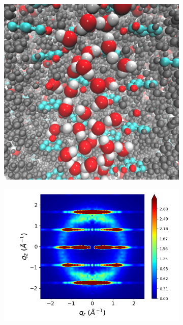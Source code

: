 \documentclass[journal=jpcbfk,manuscript=article]{achemso}
\begin{document}
\begin{figure}[!htb]
\begin{subfigure}{0.3\linewidth}
	\label{fig:staggered}
  \end{subfigure}
  \begin{subfigure}{0.3\linewidth}
  	\centering
  	\includegraphics[width=\textwidth]{solvated_pore_cross_section.png}  %
  	\label{fig:solvated_pore}
  \end{subfigure}
  \begin{subfigure}{0.3\linewidth}
  	\centering
  	\includegraphics[width=\textwidth]{rotated_monomers_rzplot_restrained.png}

\end{subfigure}
\end{figure}
\end{document}
